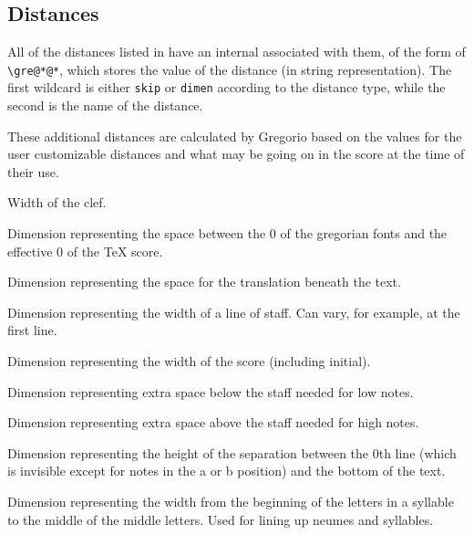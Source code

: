 \subsection{Distances}
All of the distances listed in  have an internal
associated with them, of the form of \verb=\gre@*@*=, which stores the value of the distance (in
string representation).  The first wildcard is either \texttt{skip} or \texttt{dimen} according to the distance type, while the second is the name of the distance.

These additional distances are calculated by Gregorio based on the values for the user customizable distances and what may be going on in the score at the time of their use.

Width of the clef.

Dimension representing the space between the 0 of the gregorian fonts and the effective 0 of the TeX score.

Dimension representing the space for the translation beneath the text.

Dimension representing the width of a line of staff.  Can vary, for
example, at the first line.

Dimension representing the width of the score (including initial).

Dimension representing extra space below the staff needed for low notes.

Dimension representing extra space above the staff needed for high notes.

Dimension representing the height of the separation between the 0th
line (which is invisible except for notes in the a or b position) and
the bottom of the text.

Dimension representing the width from the beginning of the letters in
a syllable to the middle of the middle letters.  Used for lining up
neumes and syllables.

